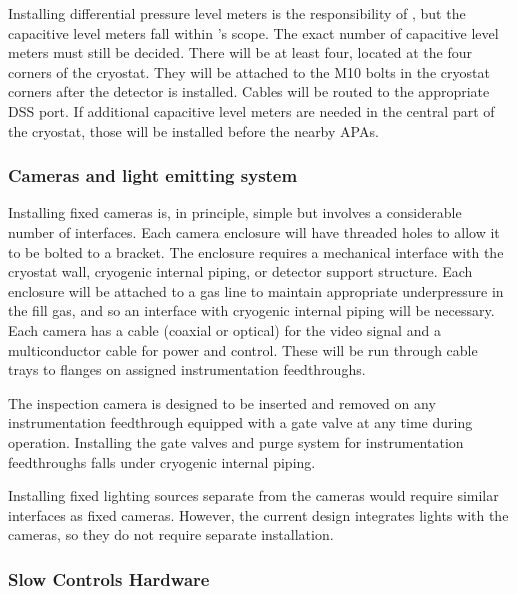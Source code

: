 Installing differential pressure level meters is the responsibility of , but the capacitive level meters fall within 's scope. The exact number of capacitive level meters must still be decided. There will be at least four, located at the four corners of the cryostat. 
They will be attached to the M10 bolts in the cryostat corners after the detector is installed. Cables will be routed to the appropriate DSS port. If additional capacitive level meters are needed in the central part of the cryostat, those will be installed before the nearby APAs. 

\subsubsection{Cameras and light emitting system}
\label{sec:fdgen-slow-cryo-install-c}

Installing fixed cameras is, in principle, simple but involves a
considerable number of interfaces. Each camera enclosure will have
threaded holes to allow it  to be bolted to a bracket. The enclosure requires a mechanical
interface with the cryostat wall, cryogenic internal
piping, or detector support structure. Each enclosure will be attached
to a gas line to maintain appropriate underpressure in the fill
gas, and so an interface with cryogenic internal piping will be necessary. Each camera has a
cable (coaxial or optical) for the video signal and a multiconductor
cable for power and control. These will be run through cable trays to flanges
on assigned instrumentation feedthroughs.

The inspection camera is designed to be inserted and removed on any
instrumentation feedthrough equipped with a gate valve at any time
during operation.  Installing the gate valves and purge system
for instrumentation feedthroughs falls under cryogenic internal
piping.

Installing fixed lighting sources separate from the cameras would
require similar interfaces as fixed cameras.  However, the current
design integrates lights with the cameras, so they do not require separate
installation.



\subsubsection{Slow Controls Hardware}
\label{sec:fdgen-slow-cryo-install-sc-hard}

